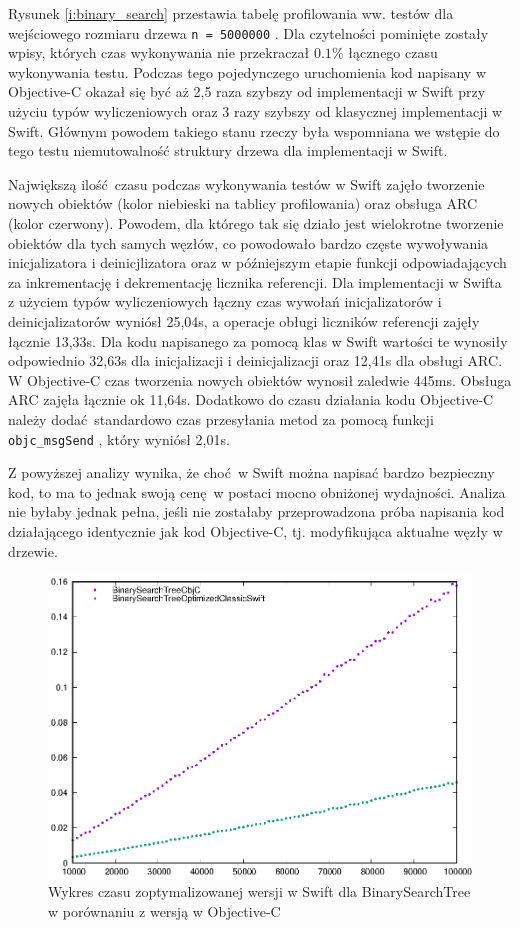 \documentclass[mgr, shortabstract]{iithesis}
\newcommand{\swiftinline}[1]{
    \texttt{#1}
}
\newcommand{\objcinline}[1]{
    \texttt{#1}
}
\begin{document}
Rysunek \ref{i:binary_search} przestawia tabelę profilowania ww. testów dla wejściowego rozmiaru drzewa \swiftinline{n = 5000000}. Dla czytelności pominięte zostały wpisy, których czas wykonywania nie przekraczał $0.1\%$ łącznego czasu wykonywania testu. Podczas tego pojedynczego uruchomienia kod napisany w Objective-C okazał się być aż 2,5 raza szybszy od implementacji w Swift przy użyciu typów wyliczeniowych oraz 3 razy szybszy od klasycznej implementacji w Swift. Głównym powodem takiego stanu rzeczy była wspomniana we wstępie do tego testu niemutowalność struktury drzewa dla implementacji w Swift. 

Największą ilość czasu podczas wykonywania testów w Swift zajęło tworzenie nowych obiektów (kolor niebieski na tablicy profilowania) oraz obsługa ARC (kolor czerwony). Powodem, dla którego tak się działo jest wielokrotne tworzenie obiektów dla tych samych węzłów, co powodowało bardzo częste wywoływania inicjalizatora i deinicjlizatora oraz w późniejszym etapie funkcji odpowiadających za inkrementację i dekrementację licznika referencji. Dla implementacji w Swifta z użyciem typów wyliczeniowych łączny czas wywołań inicjalizatorów i deinicjalizatorów wyniósł 25,04s, a operacje obługi liczników referencji zajęły łącznie 13,33s. Dla kodu napisanego za pomocą klas w Swift wartości te wynosiły odpowiednio 32,63s dla inicjalizacji i deinicjalizacji oraz 12,41s dla obsługi ARC. W Objective-C czas tworzenia nowych obiektów wynosił zaledwie 445ms. Obsługa ARC zajęła łącznie ok 11,64s. Dodatkowo do czasu działania kodu Objective-C należy dodać standardowo czas przesyłania metod za pomocą funkcji \objcinline{objc_msgSend}, który wyniósł 2,01s.

Z powyższej analizy wynika, że choć w Swift można napisać bardzo bezpieczny kod, to ma to jednak swoją cenę w postaci mocno obniżonej wydajności. Analiza nie byłaby jednak pełna, jeśli nie zostałaby przeprowadzona próba napisania kod działającego identycznie jak kod Objective-C, tj. modyfikująca aktualne węzły w drzewie. 

\begin{figure}
    \includegraphics{plots/BinarySearchTree2.eps}
    \caption{Wykres czasu zoptymalizowanej wersji w Swift dla BinarySearchTree w porównaniu z wersją w Objective-C}
    \label{p:binary_search2}
\end{figure}
\end{document}
